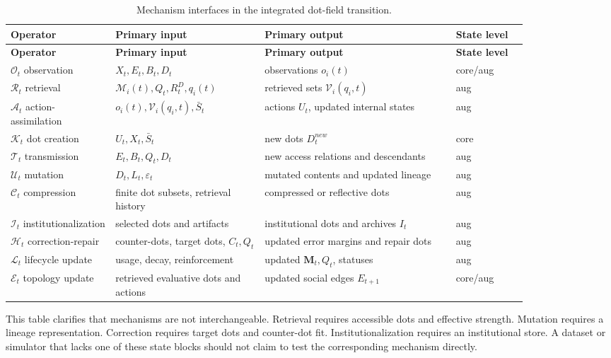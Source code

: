 \documentclass[11pt]{article}
\theoremstyle{remark}
\begin{document}
{\small
\begin{longtable}{@{}L{0.16\linewidth}L{0.25\linewidth}L{0.32\linewidth}L{0.12\linewidth}@{}}
\caption{Mechanism interfaces in the integrated dot-field transition.}\label{tab:mixed-mechanism-interfaces}\\
\toprule
\textbf{Operator} & \textbf{Primary input} & \textbf{Primary output} & \textbf{State level}\\
\midrule
\endfirsthead
\toprule
\textbf{Operator} & \textbf{Primary input} & \textbf{Primary output} & \textbf{State level}\\
\midrule
\endhead
\(\mathscr O_t\) observation & \(X_t,E_t,B_t,D_t\) & observations \(o_i(t)\) & core/aug\\
\(\mathscr R_t\) retrieval & \(\mathcal M_i(t),Q_t,R_t^D,q_i(t)\) & retrieved sets \(\mathcal V_i(q_i,t)\) & aug\\
\(\mathscr A_t\) action-assimilation & \(o_i(t),\mathcal V_i(q_i,t),\bar S_t\) & actions \(U_t\), updated internal states & aug\\
\(\mathscr K_t\) dot creation & \(U_t,X_t,\bar S_t\) & new dots \(D_t^{new}\) & core\\
\(\mathscr T_t\) transmission & \(E_t,B_t,Q_t,D_t\) & new access relations and descendants & aug\\
\(\mathscr U_t\) mutation & \(D_t,L_t,\varepsilon_t\) & mutated contents and updated lineage & aug\\
\(\mathscr C_t\) compression & finite dot subsets, retrieval history & compressed or reflective dots & aug\\
\(\mathscr I_t\) institutionalization & selected dots and artifacts & institutional dots and archives \(I_t\) & aug\\
\(\mathscr H_t\) correction-repair & counter-dots, target dots, \(C_t,Q_t\) & updated error margins and repair dots & aug\\
\(\mathscr L_t\) lifecycle update & usage, decay, reinforcement & updated \(\mathbf M_t,Q_t\), statuses & aug\\
\(\mathscr E_t\) topology update & retrieved evaluative dots and actions & updated social edges \(E_{t+1}\) & core/aug\\
\bottomrule
\end{longtable}
}

This table clarifies that mechanisms are not interchangeable. Retrieval requires accessible dots and effective strength. Mutation requires a lineage representation. Correction requires target dots and counter-dot fit. Institutionalization requires an institutional store. A dataset or simulator that lacks one of these state blocks should not claim to test the corresponding mechanism directly.
\end{document}
